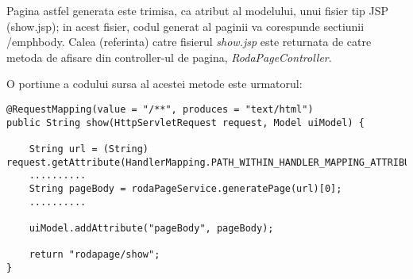 \bigskip

Pagina astfel generata este trimisa, ca atribut al modelului, unui fisier tip JSP (show.jsp); 
in acest fisier, codul generat al paginii va corespunde sectiunii /emph{body}.
Calea (referinta) catre fisierul \emph{show.jsp} este returnata de catre metoda de afisare din controller-ul de pagina, \emph{RodaPageController}.

O portiune a codului sursa al acestei metode este urmatorul:

\begin{lstlisting}[breaklines=true]
@RequestMapping(value = "/**", produces = "text/html")
public String show(HttpServletRequest request, Model uiModel) {

	String url = (String) request.getAttribute(HandlerMapping.PATH_WITHIN_HANDLER_MAPPING_ATTRIBUTE);
	..........
	String pageBody = rodaPageService.generatePage(url)[0];
	..........

	uiModel.addAttribute("pageBody", pageBody);

	return "rodapage/show";
}
\end{lstlisting}	